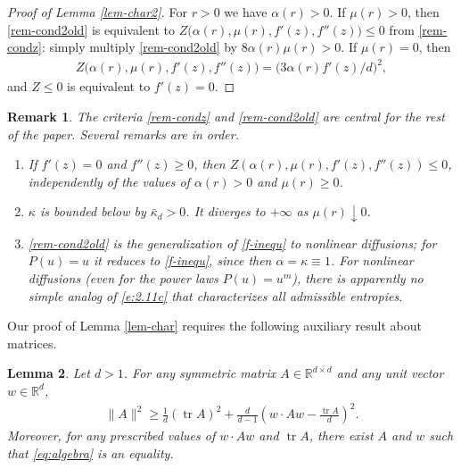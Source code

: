 \documentclass[reqno]{amsart}
\newtheorem{lemma}{Lemma}[section]
\newtheorem{remark}[lemma]{Remark}
\newcommand{\tr}{\operatorname{tr}}
\newcommand{\R}{\mathbb{R}}
\begin{document}
%
\begin{proof}[Proof of Lemma \ref{lem-char2}]
    For $r>0$ we have $\alpha(r)>0$. 
    If $\mu(r)>0$, then \eqref{rem-cond2old} is equivalent to $Z\big(\alpha(r),\mu(r),f'(z),f''(z)\big)\le 0$ from \eqref{rem-condz}: simply multiply \eqref{rem-cond2old} by $8\alpha(r)\mu(r)>0$. If $\mu(r)=0$, then 
    \begin{align*}
     Z\big(\alpha(r),\mu(r),f'(z),f''(z)\big) = \big(3\alpha(r)f'(z)/d\big)^2,
    \end{align*}
    and $Z\le0$ is equivalent to $f'(z)=0$.
\end{proof}
%
\begin{remark}\label{noticevalues}
    The criteria \eqref{rem-condz} and \eqref{rem-cond2old} are central for the rest of the paper. Several remarks are in order.
    \begin{enumerate}
    \item[(a)] If $f'(z)=0$ and $f''(z)\ge0$, then $Z(\alpha(r),\mu(r),f'(z),f''(z))\le0$, independently of the values of $\alpha(r)>0$ and $\mu(r)\ge0$.
    \item[(b)] $\kappa$ is bounded below by $\bar\kappa_d>0$. It diverges to $+\infty$ as $\mu(r)\downarrow0$.
    \item[(c)] \eqref{rem-cond2old} is the generalization of \eqref{f-inequ} to nonlinear diffusions; for $P(u)=u$ it reduces to \eqref{f-inequ}, since then $\alpha=\kappa\equiv 1$. For nonlinear diffusions (even for the power laws $P(u)=u^m$), there is apparently no simple analog of \eqref{e:2.11c} that characterizes all admissible entropies.  
  \end{enumerate}
\end{remark}
%
Our proof of Lemma \ref{lem-char} requires the following auxiliary result about matrices.
%
\begin{lemma}
    \label{lem:algebra}
    Let $d>1$. 
    For any symmetric matrix $A\in\R^{d\times d}$ and any unit vector $w\in\R^d$,
    \begin{align}
        \label{eq:algebra}
        \|A\|^2 \ge \frac1d(\tr A)^2 + \frac{d}{d-1}\left(w\cdot Aw - \frac{\tr A}d\right)^2.
    \end{align}
    Moreover, for any prescribed values of $w\cdot Aw$ and $\tr A$, there exist $A$ and $w$ such that \eqref{eq:algebra} is an equality.
\end{lemma}
%
\end{document}
